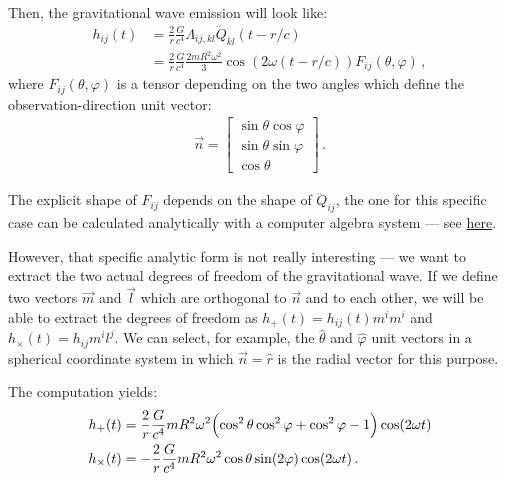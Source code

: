 \documentclass[main.tex]{subfiles}
\begin{document}
Then, the gravitational wave emission will look like: 
%
\begin{align}
h_{ij} (t) &= \frac{2}{r} \frac{G}{c^{4}} \Lambda_{ij, kl} \ddot{Q}_{kl} (t - r/ c)  \\
&= \frac{2}{r} \frac{G}{c^{4}} \frac{2 m R^2 \omega^2}{3} 
\cos(2 \omega (t - r/c)) F_{i j} (\theta , \varphi )
\,,
\end{align}
%
where \(F_{i j}(\theta , \varphi )\) is a tensor depending on the two angles which define the observation-direction unit vector:
%
\begin{align}
\vec{n} = \left[\begin{array}{c}
\sin \theta \cos \varphi  \\ 
\sin \theta \sin \varphi  \\ 
\cos \theta 
\end{array}\right]
\,.
\end{align}

The explicit shape of \(F_{i j}\) depends on the shape of \(\ddot{Q}_{i j}\), the one for this specific case can be calculated analytically with a computer algebra system --- see \href{https://jacopok.github.io/tt_gauge_gw.html}{here}.

However, that specific analytic form is not really interesting --- we want to extract the two actual degrees of freedom of the gravitational wave. 
If we define two vectors \(\vec{m}\) and \(\vec{l}\) which are orthogonal to \(\vec{n}\) and to each other, we will be able to extract the degrees of freedom as \(h_+ (t) = h_{ij} (t) m^i m^i\) and \(h_\times (t) = h_{ij} m^i l^{j}\). 
We can select, for example, the \(\hat{\theta} \) and \(\hat{\varphi}\) unit vectors in a spherical coordinate system in which \(\vec{n} = \hat{r}\) is the radial vector for this purpose. 

The computation yields: 
%
\begin{align}
h_+ (t) &= \frac{2}{r} \frac{G}{c^{4}} m R^2 \omega^2  \qty(\cos^2 \theta \cos^2 \varphi + \cos^2 \varphi  - 1) \cos(2 \omega t) \\
h_\times (t) &= - \frac{2}{r} \frac{G}{c^{4}}  m R^2 \omega^2  \cos \theta \sin( 2 \varphi ) \cos(2 \omega t)
\,.
\end{align}

\end{document}
